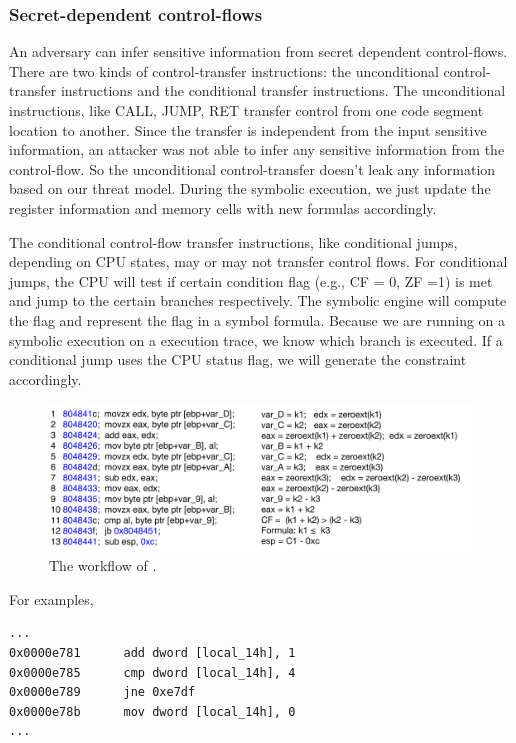 \subsubsection{Secret-dependent control-flows}
An adversary can infer sensitive information from secret dependent control-flows. 
There are two kinds of control-transfer instructions: the unconditional 
control-transfer instructions and the conditional transfer instructions.
The unconditional instructions, like CALL, JUMP, RET transfer control
from one code segment location to another. Since the transfer is 
independent from the input sensitive information, an attacker was 
not able to infer any sensitive information from the control-flow. 
So the unconditional control-transfer doesn't leak any information 
based on our threat model. During the symbolic execution, 
we just update the register information and memory cells with 
new formulas accordingly.

The conditional control-flow transfer instructions, like conditional jumps,
depending on CPU states, may or may not transfer control flows.
For conditional jumps, the CPU will test if certain condition flag 
(e.g., CF = 0, ZF =1) is met and jump to the certain branches respectively.
The symbolic engine will compute the flag and represent the flag 
in a symbol formula. Because we are running on a symbolic execution 
on a execution trace, we know which branch is executed.
If a conditional jump uses the CPU status flag, we will generate 
the constraint accordingly.

\begin{figure}[ht]
      \centering
      \includegraphics[width=\columnwidth]{./figures/secretCF.pdf}
      \caption{The workflow of \tool{}.  }
      \label{fig:Test-------------------}
  \end{figure}

For examples,

\begin{lstlisting}
...
0x0000e781      add dword [local_14h], 1
0x0000e785      cmp dword [local_14h], 4
0x0000e789      jne 0xe7df
0x0000e78b      mov dword [local_14h], 0
...
\end{lstlisting}

